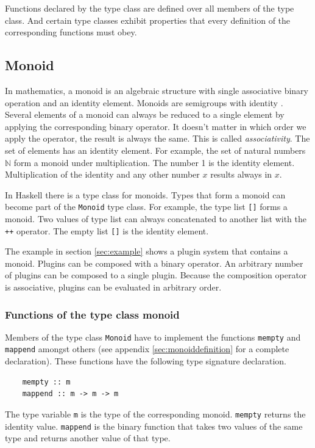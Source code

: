 Functions declared by the type class are defined over all members of the type class. And certain type classes exhibit properties that every definition of the corresponding functions must obey.

\subsection{Monoid}
\label{sec:monoid}

In mathematics, a \gls{monoid} is an algebraic structure with single associative binary operation and an identity element. Monoids are semigroups with identity \cite{wiki:monoid} \cite{renshaw}. Several elements of a monoid can always be reduced to a single element by applying the corresponding binary operator. It doesn't matter in which order we apply the operator, the result is always the same. This is called \emph{\gls{associativity}}. The set of elements has an identity element. For example, the set of natural numbers $\mathbb{N}$ form a monoid under multiplication.  The number 1 is the identity element. Multiplication of the identity and any other number $x$ results always in $x$.

In Haskell there is a type class for monoids. Types that form a monoid can become part of the \verb|Monoid| type class. For example, the type list \verb|[]| forms a monoid. Two values of type list can always concatenated to another list with the \verb|++| operator. The empty list \verb|[]| is the identity element. 

The example in section \ref{sec:example} shows a plugin system that contains a monoid. Plugins can be composed with a binary operator. An arbitrary number of plugins can be composed to a single plugin. Because the composition operator is associative, plugins can be evaluated in arbitrary order.

\subsubsection{Functions of the type class monoid}

Members of the type class \verb|Monoid| have to implement the functions \verb|mempty| and \verb|mappend| amongst others (see appendix \ref{sec:monoiddefinition} for a complete declaration).
These functions have the following type signature declaration.
\begin{verbatim}
    mempty :: m
    mappend :: m -> m -> m
\end{verbatim}
The type variable \verb|m| is the type of the corresponding monoid.
\verb|mempty| returns the identity value. \verb|mappend| is the binary function that takes two values of the same type and returns another value of that type. 

